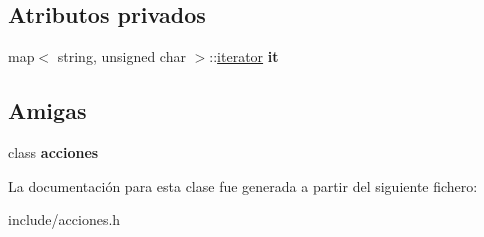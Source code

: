 \subsection*{Atributos privados}
\begin{DoxyCompactItemize}
\item 
\mbox{\label{classacciones_1_1iterator_a82f513e0ccc22a4bb9d7fc90ea7aed4b}} 
map$<$ string, unsigned char $>$\+::\hyperlink{classacciones_1_1iterator}{iterator} {\bfseries it}
\end{DoxyCompactItemize}
\subsection*{Amigas}
\begin{DoxyCompactItemize}
\item 
\mbox{\label{classacciones_1_1iterator_a3f1c44dc77cc49bcbcfe50ed73699b5a}} 
class {\bfseries acciones}
\end{DoxyCompactItemize}


La documentación para esta clase fue generada a partir del siguiente fichero\+:\begin{DoxyCompactItemize}
\item 
include/acciones.\+h\end{DoxyCompactItemize}
